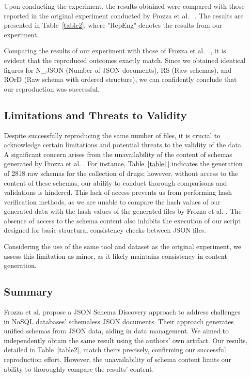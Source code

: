 \documentclass[sigconf, nonacm]{acmart}
\begin{document}
Upon conducting the experiment, the results obtained were compared with those reported in the original experiment conducted by Frozza et al. ~\cite{frozza2018approach}. The results are presented in Table~\ref{table2}, where "RepEng" denotes the results from our experiment.


\vspace{-5pt}
Comparing the results of our experiment with those of Frozza et al. ~\cite{frozza2018approach}, it is evident that the reproduced outcomes exactly match. Since we obtained identical figures for N\_JSON (Number of JSON documents), RS (Raw schemas), and ROrD (Raw schema with ordered structure), we can confidently conclude that our reproduction was successful.

\subsection{Limitations and Threats to Validity}

Despite successfully reproducing the same number of files, it is crucial to acknowledge certain limitations and potential threats to the validity of the data. A significant concern arises from the unavailability of the content of schemas generated by Frozza et al. \cite{frozza2018approach}. For instance, Table~\ref{table1} indicates the generation of 2818 raw schemas for the collection of drugs; however, without access to the content of these schemas, our ability to conduct thorough comparisons and validations is hindered. This lack of access prevents us from performing hash verification methods, as we are unable to compare the hash values of our generated data with the hash values of the generated files by Frozza et al. \cite{frozza2018approach}. The absence of access to the schema content also inhibits the execution of our script designed for basic structural consistency checks between JSON files.

Considering the use of the same tool and dataset as the original experiment, we assess this limitation as minor, as it likely maintains consistency in content generation.
 

\subsection{Summary}
Frozza et al. \cite{frozza2018approach} propose a JSON Schema Discovery approach to address challenges in NoSQL databases' schemaless JSON documents. Their approach generates unified schemas from JSON data, aiding in data management. We aimed to independently obtain the same result using the authors' own artifact. Our results, detailed in Table~\ref{table2}, match theirs precisely, confirming our successful reproduction effort. However, the unavailability of schema content limits our ability to thoroughly compare the results' content.




\end{document}
